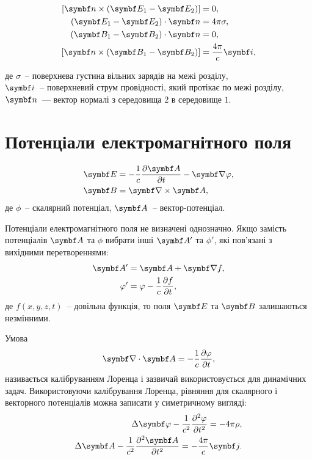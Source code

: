 \begin{align}
	\left[ \vect{n} \times (\Efield_{1} - \Efield_{2}) \right] & = 0, \label{EnBc}                        \\
	\left( \Efield_{1} - \Efield_{2}\right) \cdot \vect{n}     & = 4\pi\sigma, \label{EtauBc}             \\
	\left( \Bfield_{1} - \Bfield_{2}\right) \cdot \vect{n}     & = 0,    \label{BnBc}                     \\
	\left[ \vect{n} \times (\Bfield_{1} - \Bfield_{2}) \right] & = \frac{4\pi}{c}\vect{i} \label{BtauBc},
\end{align}

\noindent%
де $\sigma$~-- поверхнева густина вільних зарядів на межі розділу,\\
$\vect{i}$~-- поверхневий струм провідності, який протікає по межі розділу, \\
$\vect{n}$~--- вектор нормалі з середовища $2$  в середовище $1$.

\section{Потенціали електромагнітного поля}

\begin{align}
	\Efield & = -\frac{1}{c}\frac{\partial \vect{A}}{\partial t} - \vect{\nabla}\phi, \label{E=phi+A} \\
	\Bfield & = \rot\vect{A},
\end{align}
де $\phi$~-- скалярний потенціал, $ \vect{A} $~-- вектор-потенціал.

Потенціали електромагнітного поля не визначені однозначно. Якщо замість потенціалів $\vect{A}$ та $\phi$ вибрати інші $\vect{A}'$ та $\phi'$, які пов'язані з вихідними перетвореннями:
\begin{align}
	\vect{A}' & = \vect{A} +\vect{\nabla}f,                     \\
	\phi'     & = \phi - \frac1c \frac{\partial f}{\partial t},
\end{align}
де  $f(x,y,z,t)$~-- довільна функція, то поля $\Efield$ та $\Bfield$ залишаються незмінними.

Умова
\begin{equation}\label{Lorentz_gauge}
	\vect\nabla\cdot\vect{A} = - \frac{1}{c}\frac{\partial\phi}{\partial t},
\end{equation}
називається калібруванням Лоренца і зазвичай використовується для динамічних задач.
Використовуючи калібрування Лоренца, рівняння для скалярного і векторного потенціалів можна записати у симетричному вигляді:
\begin{align}\label{Maxwell_equations_via_potantials}
	\Delta \vect{\phi} - \frac{1}{c^2} \frac{\partial^2 \phi}{\partial t^2} = -4\pi\rho, \\
	\Delta \vect{A} - \frac{1}{c^2} \frac{\partial^2 \vect{A}}{\partial t^2} = - \frac{4\pi}{c}\vect{j}.
\end{align}

